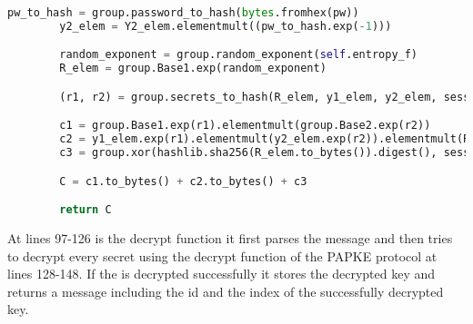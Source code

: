 \documentclass[../main.tex]{subfiles}
\begin{document}
\begin{lstlisting}[language=Python]
        pw_to_hash = group.password_to_hash(bytes.fromhex(pw))
        y2_elem = Y2_elem.elementmult((pw_to_hash.exp(-1)))

        random_exponent = group.random_exponent(self.entropy_f)
        R_elem = group.Base1.exp(random_exponent)

        (r1, r2) = group.secrets_to_hash(R_elem, y1_elem, y2_elem, session_key)

        c1 = group.Base1.exp(r1).elementmult(group.Base2.exp(r2))
        c2 = y1_elem.exp(r1).elementmult(y2_elem.exp(r2)).elementmult(R_elem)
        c3 = group.xor(hashlib.sha256(R_elem.to_bytes()).digest(), session_key)

        C = c1.to_bytes() + c2.to_bytes() + c3

        return C
\end{lstlisting}

At lines 97-126 is the decrypt function it first parses the message and then tries to
decrypt every secret using the decrypt function of the PAPKE protocol at lines 128-148. 
If the is decrypted successfully it stores the decrypted key and returns a message including
the id and the index of the successfully decrypted key.
\end{document}
